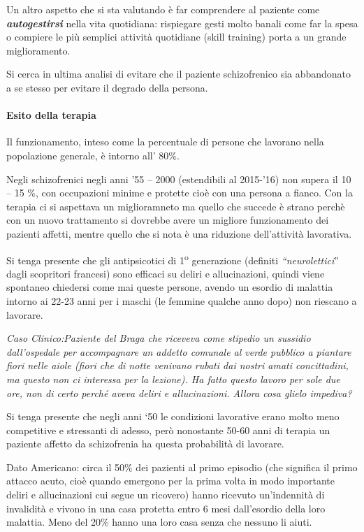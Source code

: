 Un altro aspetto che si sta valutando è far comprendere al paziente come
\textbf{\emph{autogestirsi}} nella vita quotidiana: rispiegare gesti
molto banali come far la spesa o compiere le più semplici attività
quotidiane (skill training) porta a un grande miglioramento.

Si cerca in ultima analisi di evitare che il paziente schizofrenico sia
abbandonato a se stesso per evitare il degrado della persona.

\paragraph{Esito della terapia}

Il funzionamento, inteso come la percentuale di persone che lavorano
nella popolazione generale, è intorno all' 80\%.

Negli schizofrenici negli anni '55 -- 2000 (estendibili al 2015-'16) non
supera il 10 -- 15 \%, con occupazioni minime e protette cioè con una
persona a fianco. Con la terapia ci si aspettava un miglioramneto ma
quello che succede è strano perchè con un nuovo trattamento si dovrebbe
avere un migliore funzionamento dei pazienti affetti, mentre quello che
si nota è una riduzione dell'attività lavorativa.

Si tenga presente che gli antipsicotici di 1\textsuperscript{o} generazione (definiti
\emph{``neurolettici}'' dagli scopritori francesi) sono efficaci su
deliri e allucinazioni, quindi viene spontaneo chiedersi come mai queste
persone, avendo un esordio di malattia intorno ai 22-23 anni per i
maschi (le femmine qualche anno dopo) non riescano a lavorare.

\emph{\emph{Caso Clinico:Paziente del Braga che riceveva come stipedio
un sussidio dall'ospedale per accompagnare un addetto comunale al verde
pubblico a piantare fiori nelle aiole (fiori che di notte venivano
rubati dai nostri amati concittadini, ma questo non ci interessa per la
lezione). Ha fatto questo lavoro per sole due ore, non di certo perché
aveva deliri e allucinazioni. Allora cosa glielo impediva?}}

Si tenga presente che negli anni `50 le condizioni lavorative erano
molto meno competitive e stressanti di adesso, però nonostante 50-60
anni di terapia un paziente affetto da schizofrenia ha questa
probabilità di lavorare.

Dato Americano: circa il 50\% dei pazienti al primo episodio (che
significa il primo attacco acuto, cioè quando emergono per la prima
volta in modo importante deliri e allucinazioni cui segue un ricovero)
hanno ricevuto un'indennità di invalidità e vivono in una casa protetta
entro 6 mesi dall'esordio della loro malattia. Meno del 20\% hanno una
loro casa senza che nessuno li aiuti.

